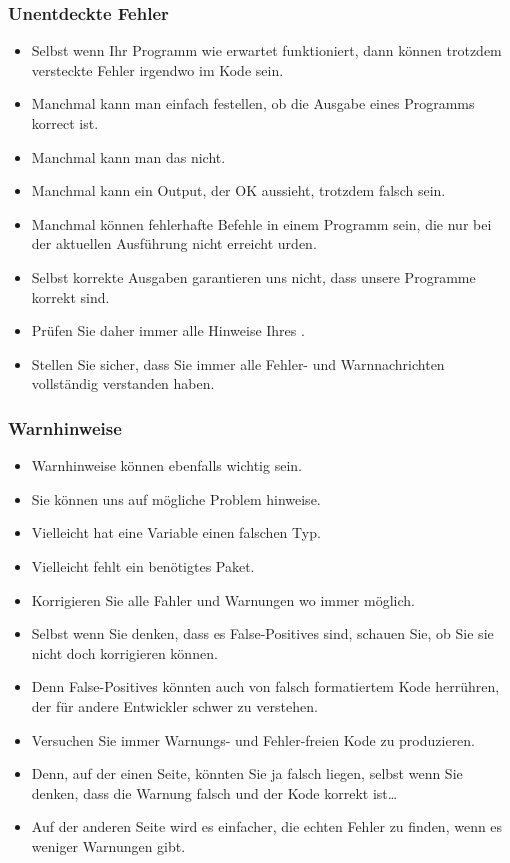 \documentclass[aspectratio=169,mathserif,notheorems]{beamer}%
\begin{document}
\begin{frame}%
\frametitle{Unentdeckte Fehler}%
\begin{itemize}%
\item Selbst wenn Ihr Programm wie erwartet funktioniert, dann können trotzdem versteckte Fehler irgendwo im Kode sein.%
%
\item<2-> Manchmal kann man einfach festellen, ob die Ausgabe eines Programms korrect ist.%
%
\item<3-> Manchmal kann man das nicht.%
%
\item<4-> Manchmal kann ein Output, der OK aussieht, trotzdem falsch sein.%
%
\item<5-> Manchmal können fehlerhafte Befehle in einem Programm sein, die nur bei der aktuellen Ausführung nicht erreicht urden.%
%
\item<6-> Selbst korrekte Ausgaben garantieren uns nicht, dass unsere Programme korrekt sind.%
%
\item<7-> Prüfen Sie daher immer alle Hinweise Ihres .%
%
\item<8-> Stellen Sie sicher, dass Sie immer alle Fehler- und Warnnachrichten vollständig verstanden haben.%
%
\end{itemize}%
\end{frame}%
%
\begin{frame}%
\frametitle{Warnhinweise}%
%
\begin{itemize}%
\item Warnhinweise können ebenfalls wichtig sein.%
\item<2-> Sie können uns auf mögliche Problem hinweise.%
\item<3-> Vielleicht hat eine Variable einen falschen Typ.%
\item<4-> Vielleicht fehlt ein benötigtes Paket.%
\item<5-> Korrigieren Sie alle Fahler und Warnungen wo immer möglich.%
\item<6-> Selbst wenn Sie denken, dass es False-Positives sind, schauen Sie, ob Sie sie nicht doch korrigieren können.%
\item<7-> Denn False-Positives könnten auch von falsch formatiertem Kode herrühren, der für andere Entwickler schwer zu verstehen.%
\item<8-> Versuchen Sie immer Warnungs- und Fehler-freien Kode zu produzieren.%
\item<9-> Denn, auf der einen Seite, könnten Sie ja falsch liegen, selbst wenn Sie denken, dass die Warnung falsch und der Kode korrekt ist\dots%
\item<10-> Auf der anderen Seite wird es einfacher, die echten Fehler zu finden, wenn es weniger Warnungen gibt.%
\end{itemize}%
\end{frame}%
\end{document}
